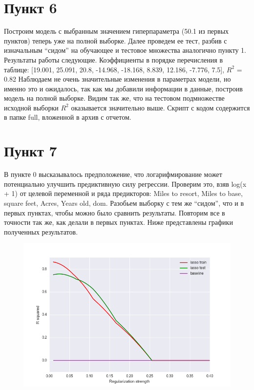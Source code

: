 \documentclass[a4paper, 12pt, oneside]{scrartcl}
\numberwithin{equation}{section}
\numberwithin{table}{section}
\numberwithin{figure}{section}
\begin{document}
\section*{Пункт 6}
Построим модель с выбранным значением гиперпараметра (50.1 из первых пунктов) теперь уже на полной выборке. 
Далее проведем ее тест, разбив с изначальным “сидом” на обучающее и тестовое множества аналогично 
пункту 1. Результаты работы следующие. Коэффициенты в порядке перечисления в таблице: 
[19.001, 25.091, 20.8, -14.968, -18.168, 8.839, 12.186, -7.776, 7.5], $ R^2 $ = 0.82
Наблюдаем не очень значительные изменения в параметрах модели, но именно это и ожидалось, 
так как мы добавили информации в данные, построив модель на полной выборке. Видим так же, что 
на тестовом подмножестве исходной выборки $ R^2 $ оказывается значительно выше. 
Скрипт с кодом содержится в папке full, вложенной в архив с отчетом.

\section*{Пункт 7}
В пункте 0 высказывалось предположение, что логарифмирование может потенциально улучшить предиктивную 
силу регрессии. Проверим это, взяв log(x + 1) от целевой переменной и ряда предикторов: Miles to resort, 
Miles to base, square feet, Acres, Years old, dom. Разобьем выборку с тем же “сидом”, что и в первых 
пунктах, чтобы можно было сравнить результаты. Повторим все в точности так же, как делали в первых пунктах.
Ниже представлены графики полученных результатов.
\begin{figure}[H]
    \centering
    \includegraphics[width=\linewidth]{r2_lasso.png}
\end{figure}
\end{document}
